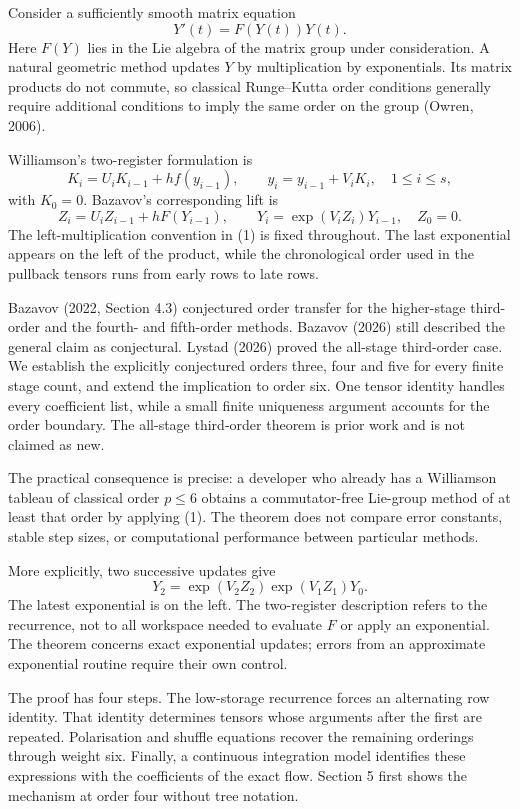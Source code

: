 \documentclass[
  11pt,
  a4paper,
]{scrartcl}
\begin{document}
Consider a sufficiently smooth matrix equation \[
Y'(t)=F(Y(t))Y(t).
\] Here \(F(Y)\) lies in the Lie algebra of the matrix group under
consideration. A natural geometric method updates \(Y\) by
multiplication by exponentials. Its matrix products do not commute, so
classical Runge--Kutta order conditions generally require additional
conditions to imply the same order on the group (Owren, 2006).

Williamson's two-register formulation is \[
K_i=U_iK_{i-1}+h f(y_{i-1}),\qquad y_i=y_{i-1}+V_iK_i,\quad 1\leq i\leq s,
\] with \(K_0=0\). Bazavov's corresponding lift is \[
Z_i=U_iZ_{i-1}+hF(Y_{i-1}),\qquad
Y_i=\exp(V_iZ_i)Y_{i-1},\quad Z_0=0.
\tag{1}
\] The left-multiplication convention in (1) is fixed throughout. The
last exponential appears on the left of the product, while the
chronological order used in the pullback tensors runs from early rows to
late rows.

Bazavov (2022, Section 4.3) conjectured order transfer for the
higher-stage third-order and the fourth- and fifth-order methods.
Bazavov (2026) still described the general claim as conjectural. Lystad
(2026) proved the all-stage third-order case. We establish the
explicitly conjectured orders three, four and five for every finite
stage count, and extend the implication to order six. One tensor
identity handles every coefficient list, while a small finite uniqueness
argument accounts for the order boundary. The all-stage third-order
theorem is prior work and is not claimed as new.

The practical consequence is precise: a developer who already has a
Williamson tableau of classical order \(p\leq6\) obtains a
commutator-free Lie-group method of at least that order by applying (1).
The theorem does not compare error constants, stable step sizes, or
computational performance between particular methods.

More explicitly, two successive updates give \[
Y_2=\exp(V_2Z_2)\exp(V_1Z_1)Y_0.
\] The latest exponential is on the left. The two-register description
refers to the recurrence, not to all workspace needed to evaluate \(F\)
or apply an exponential. The theorem concerns exact exponential updates;
errors from an approximate exponential routine require their own
control.

The proof has four steps. The low-storage recurrence forces an
alternating row identity. That identity determines tensors whose
arguments after the first are repeated. Polarisation and shuffle
equations recover the remaining orderings through weight six. Finally, a
continuous integration model identifies these expressions with the
coefficients of the exact flow. Section 5 first shows the mechanism at
order four without tree notation.
\end{document}
